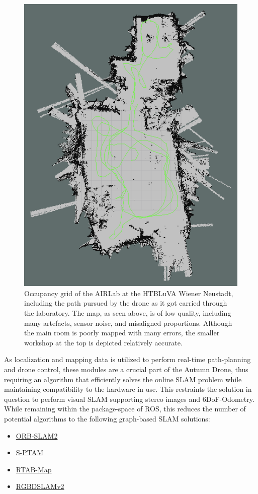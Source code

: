 \begin{figure}
	\centering
	\includegraphics[width=0.8\linewidth]{img/airlabMap}
	\caption{
		Occupancy grid of the AIRLab at the HTBLuVA Wiener Neustadt, including the path pursued by the drone as it got carried through the laboratory. The map, as seen above, is of low quality, including many artefacts, sensor noise, and misaligned proportions.
		Although the main room is poorly mapped with many errors, the smaller workshop at the top is depicted relatively accurate.
	}
	\label{fig:AirLABmap}
\end{figure}

As localization and mapping data is utilized to perform real-time path-planning and drone control, these modules are a crucial part of the Autumn Drone, thus requiring an algorithm that efficiently solves the online SLAM problem while maintaining compatibility to the hardware in use. This restraints the solution in question to perform visual SLAM supporting stereo images and 6DoF-Odometry. 
While remaining within the package-space of ROS, this reduces the number of potential algorithms to the following graph-based SLAM solutions:
\begin{itemize}
	\item \href{https://github.com/raulmur/ORB_SLAM2}{ORB-SLAM2}
	\item \href{https://github.com/lrse/sptam}{S-PTAM}
	\item \href{http://introlab.github.io/rtabmap/}{RTAB-Map}
	\item \href{https://felixendres.github.io/rgbdslam_v2/}{RGBDSLAMv2}
\end{itemize}

